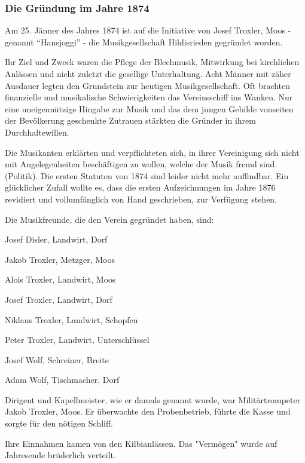 \begin{history}

    \subsubsection*{Die Gründung im Jahre 1874}

    Am 25. Jänner des Jahres 1874 ist auf die Initiative von Josef Troxler, Moos
    - genannt \enquote{Hansjoggi} - die Musikgesellschaft Hildisrieden gegründet
    worden.

    Ihr Ziel und Zweck waren die Pflege der Blechmusik, Mitwirkung bei
    kirchlichen Anlässen und nicht zuletzt die gesellige Unterhaltung. Acht
    Männer mit zäher Ausdauer legten den Grundstein zur heutigen
    Musikgesellschaft. Oft brachten finanzielle und musikalische Schwierigkeiten
    das Vereinsschiff ins Wanken. Nur eine uneigennützige Hingabe zur Musik und
    das dem jungen Gebilde vonseiten der Bevölkerung geschenkte Zutrauen
    stärkten die Gründer in ihrem Durchhaltewillen.

    Die Musikanten erklärten und verpflichteten sich, in ihrer Vereinigung sich
    nicht mit Angelegenheiten beschäftigen zu wollen, welche der Musik fremd
    sind. (Politik). Die ersten Statuten von 1874 sind leider nicht mehr
    auffindbar. Ein glücklicher Zufall wollte es, dass die ersten Aufzeichnungen
    im Jahre 1876 revidiert und vollumfänglich von Hand geschrieben, zur
    Verfügung stehen.

    \noindent Die Musikfreunde, die den Verein gegründet haben, sind:

    Josef Disler, Landwirt, Dorf

    Jakob Troxler, Metzger, Moos

    Alois Troxler, Landwirt, Moos

    Josef Troxler, Landwirt, Dorf

    Niklaus Troxler, Landwirt, Schopfen

    Peter Troxler, Landwirt, Unterschlüssel

    Josef Wolf, Schreiner, Breite

    Adam Wolf, Tischmacher, Dorf

    \noindent  Dirigent und Kapellmeister, wie er damals genannt wurde, war
    Militärtrompeter Jakob Troxler, Moos. Er überwachte den Probenbetrieb,
    führte die Kasse und sorgte für den nötigen Schliff.

    Ihre Einnahmen kamen von den Kilbianlässen. Das "Vermögen" wurde auf
    Jahresende brüderlich verteilt.

\end{history}
